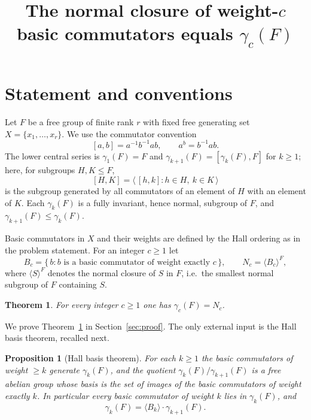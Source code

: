 \documentclass{amsart}
\newtheorem{theorem}{Theorem}
\newtheorem{proposition}{Proposition}
\theoremstyle{definition}
\theoremstyle{remark}
\begin{document}
\title{The normal closure of weight-$c$ basic commutators equals $\gamma_c(F)$}
\maketitle

\section{Statement and conventions}

Let $F$ be a free group of finite rank $r$ with fixed free generating set
$X=\{x_1,\dots,x_r\}$. We use the commutator convention
\[
[a,b]=a^{-1}b^{-1}ab ,\qquad a^{b}=b^{-1}ab .
\]
The lower central series is $\gamma_1(F)=F$ and $\gamma_{k+1}(F)=[\gamma_k(F),F]$
for $k\ge 1$; here, for subgroups $H,K\le F$,
\[
[H,K]=\big\langle\, [h,k] : h\in H,\ k\in K \,\big\rangle
\]
is the subgroup generated by all commutators of an element of $H$ with an element
of $K$. Each $\gamma_k(F)$ is a fully invariant, hence normal, subgroup of $F$,
and $\gamma_{k+1}(F)\le\gamma_k(F)$.

Basic commutators in $X$ and their weights are defined by the Hall ordering as in
the problem statement. For an integer $c\ge 1$ let
\[
B_c=\{\,b : b \text{ is a basic commutator of weight exactly } c\,\},
\qquad
N_c=\langle B_c\rangle^{F},
\]
where $\langle S\rangle^{F}$ denotes the normal closure of $S$ in $F$, i.e.\ the
smallest normal subgroup of $F$ containing $S$.

\begin{theorem}\label{thm:main}
For every integer $c\ge 1$ one has $\gamma_c(F)=N_c$.
\end{theorem}

We prove Theorem~\ref{thm:main} in Section~\ref{sec:proof}. The only external
input is the Hall basis theorem, recalled next.

\begin{proposition}[Hall basis theorem]\label{prop:hall}
For each $k\ge 1$ the basic commutators of weight $\ge k$ generate $\gamma_k(F)$,
and the quotient $\gamma_k(F)/\gamma_{k+1}(F)$ is a free abelian group whose basis
is the set of images of the basic commutators of weight exactly $k$. In
particular every basic commutator of weight $k$ lies in $\gamma_k(F)$, and
\begin{equation}\label{eq:hall-decomp}
\gamma_k(F)=\langle B_k\rangle\cdot\gamma_{k+1}(F).
\end{equation}
\end{proposition}
\end{document}
